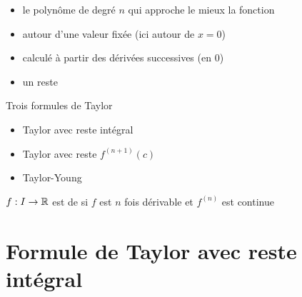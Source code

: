 \begin{frame}

\pause

\begin{itemize}
  \item le polynôme de degré $n$ qui approche le mieux la fonction
\pause

  \item autour d'une valeur fixée (ici autour de $x=0$)
\pause

  \item calculé à partir des dérivées successives (en $0$)
\pause

  \item un reste
\end{itemize}

\medskip
\pause


Trois formules de Taylor
\pause
\begin{itemize}


  \item Taylor avec reste intégral
\pause

 \item Taylor avec reste $f^{(n+1)}(c)$
\pause

  \item Taylor-Young
\end{itemize}

\medskip
\pause

$f : I \to \mathbb{R}$ est de 
si $f$ est $n$ fois dérivable et $f^{(n)}$ est continue


\end{frame}

\section{Formule de Taylor avec reste intégral}

